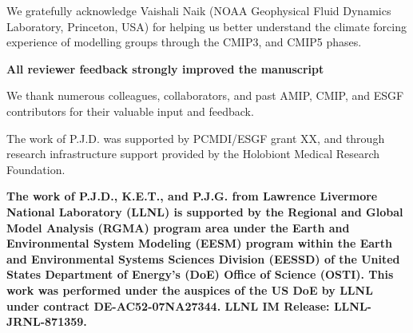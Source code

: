 \documentclass[gmd, preprint]{copernicus}
\def\cred#1{{\color{red}#1}}
\begin{document}
\begin{acknowledgements}
We gratefully acknowledge Vaishali Naik (NOAA Geophysical Fluid Dynamics Laboratory, Princeton, USA) for helping us better understand the climate forcing experience of modelling groups through the CMIP3, and CMIP5 phases.

\cred{\textbf{All reviewer feedback strongly improved the manuscript}}

We thank numerous colleagues, collaborators, and past AMIP, CMIP, and ESGF contributors for their valuable input and feedback.

The work of P.J.D. was supported by PCMDI/ESGF grant XX, and through research infrastructure support provided by the Holobiont Medical Research Foundation.

\cred{\textbf{The work of P.J.D., K.E.T., and P.J.G. from Lawrence Livermore National Laboratory (LLNL) is supported by the Regional and Global Model Analysis (RGMA) program area under the Earth and Environmental System Modeling (EESM) program within the Earth and Environmental Systems Sciences Division (EESSD) of the United States Department of Energy's (DoE) Office of Science (OSTI). This work was performed under the auspices of the US DoE by LLNL under contract DE-AC52-07NA27344. LLNL IM Release: LLNL-JRNL-871359.}}

\end{acknowledgements}











\end{document}
